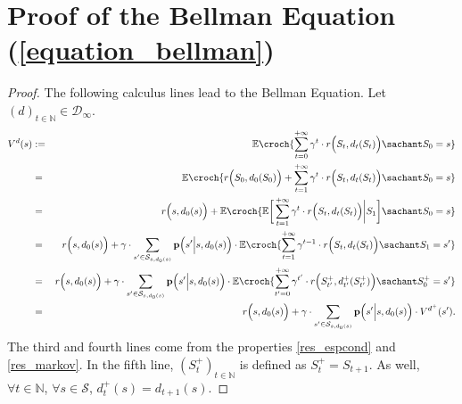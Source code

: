 \section{Proof of the Bellman Equation (\ref{equation_bellman})}
\begin{proof}
The following calculus lines 
lead to the Bellman Equation.
Let $(d)_{t \in \mathbb{N}} \in \mathcal{D}_{\infty}$.
\begin{eqnarray}
\nonumber  V^{d}(s) &  := & \mathbb{E} \croch{ \sum_{t=0}^{+\infty} \gamma^{t} \cdot r\Big(S_{t},d_t(S_{t})\Big) \sachant S_0=s}  \\
\nonumber & = & \mathbb{E} \croch{ r\Big(S_0,d_0(S_0)\Big) + \sum_{t=1}^{+\infty} \gamma^{t} \cdot r\Big(S_{t},d_t(S_{t})\Big) \sachant S_0=s} \\
\nonumber & = & r\Big(s,d_0(s)\Big) + \mathbb{E} \croch{ \mathbb{E} \bigg[ \sum_{t=1}^{+\infty} \gamma^{t} \cdot r\Big(S_{t},d_t(S_{t})\Big) \bigg\vert S_1 \bigg] \sachant S_0=s  } \\
\nonumber & = & r\Big(s,d_0(s)\Big) + \gamma \cdot \sum_{s' \in \mathcal{S}_{s,d_0(s)}} \textbf{p} \Big(s' \Big\vert s,d_0(s) \Big) \cdot  \mathbb{E} \croch{ \sum_{t=1}^{+\infty} \gamma^{t-1} \cdot r\Big(S_{t},d_t(S_{t})\Big) \sachant S_1=s' }  \\
\nonumber & = & r\Big(s,d_0(s)\Big) + \gamma \cdot \sum_{s' \in \mathcal{S}_{s,d_0(s)}} \textbf{p} \Big( s' \Big\vert s,d_0(s) \Big) \cdot  \mathbb{E} \croch{ \sum_{t'=0}^{+\infty} \gamma^{t'} \cdot r\Big(S^+_{t'},d^+_{t'}(S^+_{t'})\Big) \sachant S^+_0=s' } \\
\nonumber & = & r\Big(s,d_0(s)\Big) + \gamma \cdot \sum_{s' \in \mathcal{S}_{s,d_0(s)}} \textbf{p} \Big(s' \Big\vert s,d_0(s)\Big)  \cdot V^{d^+}(s').
\end{eqnarray}
The third and fourth lines come from the properties \ref{res_espcond} and \ref{res_markov}.
In the fifth line, $(S^+_t)_{t \in \mathbb{N}}$ is defined as
$S^+_t = S_{t+1}$. 
As well, $\forall t \in \mathbb{N}$, 
$\forall s \in \mathcal{S}$,
$d^+_t(s) = d_{t+1}(s)$. 
\end{proof}






